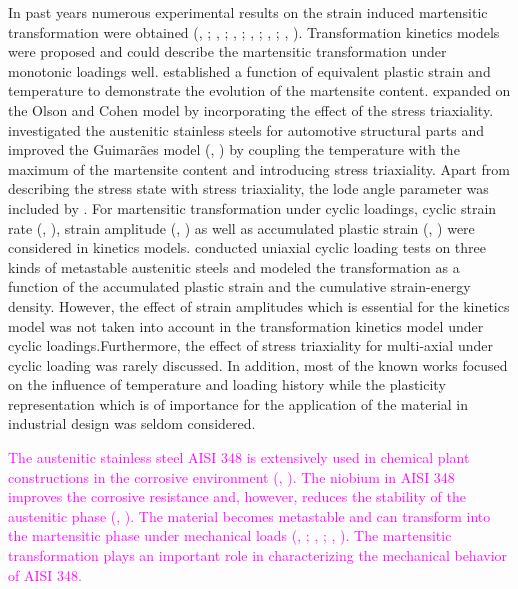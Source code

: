 \documentclass[preprint,5p,twocolumn,10pt,sort&compress]{elsarticle}
\newcommand{\jingyu}[1]{\textcolor{magenta}{#1}}
\begin{document}
In past years numerous experimental results on the strain induced martensitic transformation were obtained (\citeauthor{Angel}, \citeyear{Angel}; \citeauthor{Lecroisey1972Martensitic}, \citeyear{Lecroisey1972Martensitic}; \citeauthor{Olson1975Kinetics}, \citeyear{Olson1975Kinetics}; \citeauthor{Hecker1982Effects}, \citeyear{Hecker1982Effects}; \citeauthor{Diani1998Effects}, \citeyear{Diani1998Effects}; \citeauthor{Stringfellow1992A}, \citeyear{Stringfellow1992A}). Transformation kinetics models were proposed and could describe the martensitic transformation under monotonic loadings well. \cite{Olson1975Kinetics} established a function of equivalent plastic strain and temperature to demonstrate the evolution of the martensite content. \cite{Stringfellow1992A} expanded on the Olson and Cohen model by incorporating the effect of the stress triaxiality. \cite{Santacreu2006Behaviour} investigated the austenitic stainless steels for automotive structural parts and improved the Guimar{\~a}es model  (\citeauthor{Guimar1974Temperature}, \citeyear{Guimar1974Temperature}) by coupling the temperature with the maximum  of the martensite content and introducing stress triaxiality. Apart from describing the stress state with stress triaxiality, the lode angle parameter was included by \cite{Beese2011Effect}. For martensitic transformation under cyclic loadings, cyclic strain rate  (\citeauthor{Pegues2017Cyclic}, \citeyear{Pegues2017Cyclic}), strain amplitude  (\citeauthor{Wu2017Mechanical}, \citeyear{Wu2017Mechanical}) as well as accumulated plastic strain  (\citeauthor{Bayerlein1989Plasticity}, \citeyear{Bayerlein1989Plasticity}) were considered in kinetics models. \cite{Smaga2008Deformation} conducted uniaxial cyclic loading tests on three kinds of metastable austenitic steels and modeled the transformation as a function of the accumulated plastic strain and the cumulative strain-energy density. However, the effect of strain amplitudes which is essential for the kinetics model was not taken into account in the  transformation kinetics model under cyclic loadings.Furthermore, the effect of stress triaxiality for multi-axial under cyclic loading was rarely discussed. In addition, most of the known works focused on the influence of temperature and loading history while the plasticity representation which is of importance for the application of the material in industrial design was seldom considered.

\jingyu{The austenitic stainless steel AISI 348 is extensively used in chemical plant constructions in the corrosive environment  (\citeauthor{Nebel2003Cyclic}, \citeyear{Nebel2003Cyclic}). The niobium in AISI 348 improves the corrosive resistance and, however, reduces the stability of the austenitic phase  (\citeauthor{Hahnenberger2014Microstructural}, \citeyear{Hahnenberger2014Microstructural}). The material becomes metastable and can transform into the martensitic phase under mechanical loads (\citeauthor{Smaga2008Deformation}, \citeyear{Smaga2008Deformation}; \citeauthor{Nebel2003Cyclic}, \citeyear{Nebel2003Cyclic}; \citeauthor{Hahnenberger2014Microstructural}, \citeyear{Hahnenberger2014Microstructural}). The martensitic transformation plays an important role in characterizing the mechanical behavior of AISI 348.}
\end{document}
